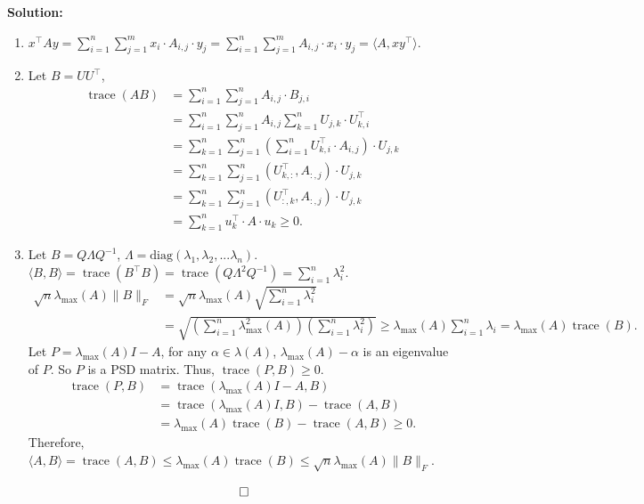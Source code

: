 \documentclass{article}
\DeclareMathOperator{\trac}{\mathrm{trace}}
\newenvironment{solution}{\color{blue} \smallskip \textbf{Solution:}}{}
\begin{document}
\begin{enumerate}
    \begin{solution}
        \begin{enumerate}
        \item 
        $x^\top A y = \sum_{i=1}^n\sum_{j=1}^m x_i\cdot A_{i,j} \cdot y_j = 
        \sum_{i=1}^n\sum_{j=1}^m A_{i,j} \cdot x_i\cdot y_j = \langle A, x y^\top \rangle$.
        \item
        Let $B = UU^\top$, 
        \begin{align*}
            \trac(AB) &= \sum_{i=1}^n\sum_{j=1}^n A_{i, j} \cdot B_{j, i} \\
            &= \sum_{i=1}^n\sum_{j=1}^n A_{i, j} \sum_{k=1}^n U_{j, k} \cdot U^\top_{k, i} \\
            &= \sum_{k=1}^n\sum_{j=1}^n (\sum_{i=1}^n U^\top_{k, i} \cdot A_{i, j}) \cdot U_{j, k} \\
            &= \sum_{k=1}^n\sum_{j=1}^n (U^\top_{k, :}, A_{:, j}) \cdot U_{j, k} \\
            &= \sum_{k=1}^n\sum_{j=1}^n (U^\top_{:, k}, A_{:, j}) \cdot U_{j, k} \\
            &= \sum_{k=1}^n u^\top_k \cdot A \cdot u_k \geq 0.
        \end{align*}
        \item
            Let $B = Q\Lambda Q^{-1}$, $\Lambda = \text{diag}(\lambda_1,\lambda_2,...\lambda_n)$. \\
            $\langle B, B \rangle = \trac(B^\top B) = \trac(Q\Lambda^2 Q^{-1})=\sum_{i=1}^n \lambda_i^2$.
            \begin{align*}
            \sqrt n \lambda_{\max}(A) \|B\|_F&=\sqrt n \lambda_{\max}(A) \sqrt{\sum_{i=1}^n \lambda_i^2} \\
            &= \sqrt{(\sum_{i=1}^n \lambda_{\max}^2(A))(\sum_{i=1}^n \lambda_i^2)} \geq \lambda_{\max}(A)\sum_{i=1}^n \lambda_i = \lambda_{\max}(A)\trac(B).
            \end{align*}
            Let $P = \lambda_{\max}(A)I-A$, for any $\alpha \in \lambda(A)$, $\lambda_{\max}(A)-\alpha$ is an eigenvalue of $P$. So $P$ is a PSD matrix. Thus, $\trac(P, B) \geq 0$.
            \begin{align*}
            \trac(P, B)&=\trac(\lambda_{\max}(A)I-A, B) \\
            &=\trac(\lambda_{\max}(A)I, B) - \trac(A, B) \\
            &= \lambda_{\max}(A)\trac(B)-\trac(A, B) \geq 0.
            \end{align*}
            Therefore, $\langle A, B \rangle = \trac(A, B) \leq \lambda_{\max}(A)\trac(B) \leq \sqrt n \lambda_{\max}(A) \|B\|_F$.
        \end{enumerate}
        \[ \qedhere \]
    \end{solution}


\end{enumerate}
\end{document}
